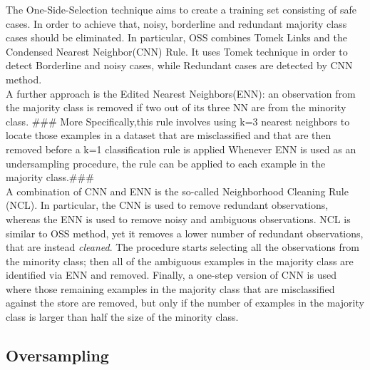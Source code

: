 The One-Side-Selection technique aims to create a training set consisting of safe cases. In order to achieve that, noisy, borderline and redundant majority class cases should be eliminated. In particular, OSS  combines Tomek Links and the Condensed Nearest Neighbor(CNN) Rule. It uses Tomek technique in order to  detect Borderline and noisy cases, while Redundant cases are detected by CNN method.\\
\noindent
A further approach is the Edited Nearest Neighbors(ENN):
an observation from the majority class is removed if two out of its three NN are from the minority class. ### More Specifically,this rule involves using k=3 nearest neighbors to locate those examples in a dataset that are misclassified and that are then removed before a k=1 classification rule is applied
Whenever ENN is used as an undersampling procedure, the rule can be applied to each example in the majority class.###\\
\noindent
A combination of CNN and ENN is the so-called Neighborhood Cleaning Rule (NCL). In particular, the CNN is used to remove redundant observations, whereas the ENN is used to remove noisy and ambiguous observations. NCL is similar to OSS method, yet it removes a lower number of redundant observations, that are instead {\em cleaned}.
The procedure starts selecting all the observations  from the minority class; then all of the ambiguous examples in the majority class are identified via ENN and removed. Finally, a one-step version of CNN is used where those remaining examples in the majority class that are misclassified against the store are removed, but only if the number of examples in the majority class is larger than half the size of the minority class.

\subsection{Oversampling}


